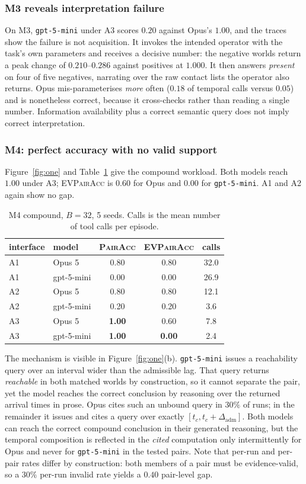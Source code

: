 \documentclass[sigconf,anonymous,review]{acmart}
\newcommand{\pairacc}{\textsc{PairAcc}}
\newcommand{\evpair}{\textsc{EVPairAcc}}
\begin{document}
\subsubsection{M3 reveals interpretation failure}
\label{sec:m3}
On M3, \texttt{gpt-5-mini} under A3 scores $0.20$ against Opus's $1.00$, and the traces show the
failure is not acquisition. It invokes the intended operator with the task's own parameters and
receives a decisive number: the negative worlds return a peak change of $0.210$--$0.286$ against
positives at $1.000$. It then answers \emph{present} on four of five negatives, narrating over the
raw contact lists the operator also returns. Opus mis-parameterises \emph{more} often ($0.18$ of
temporal calls versus $0.05$) and is nonetheless correct, because it cross-checks rather than
reading a single number. Information availability plus a correct semantic query does not imply
correct interpretation.

\subsubsection{M4: perfect accuracy with no valid support}
Figure~\ref{fig:one} and Table~\ref{tab:m4} give the compound workload. Both models reach $1.00$
under A3; \evpair{} is $0.60$ for Opus and $0.00$ for \texttt{gpt-5-mini}. A1 and A2 again show no
gap.

\begin{table}[t]
\caption{M4 compound, $B{=}32$, 5 seeds. Calls is the mean number of tool calls per episode.}
\label{tab:m4}
\small
\begin{tabular}{@{}llccc@{}}
\toprule
interface & model & \pairacc & \evpair & calls \\
\midrule
A1 & Opus 5     & 0.80 & 0.80 & 32.0 \\
A1 & gpt-5-mini & 0.00 & 0.00 & 26.9 \\
A2 & Opus 5     & 0.80 & 0.80 & 12.1 \\
A2 & gpt-5-mini & 0.20 & 0.20 & 3.6 \\
A3 & Opus 5     & \textbf{1.00} & 0.60 & 7.8 \\
A3 & gpt-5-mini & \textbf{1.00} & \textbf{0.00} & 2.4 \\
\bottomrule
\end{tabular}
\end{table}

The mechanism is visible in Figure~\ref{fig:one}(b). \texttt{gpt-5-mini} issues a reachability
query over an interval wider than the admissible lag. That query returns \emph{reachable} in both
matched worlds by construction, so it cannot separate the pair, yet the model reaches the
correct conclusion by reasoning over the returned arrival times in prose. Opus cites such an unbound query in $30\%$ of runs; in the remainder it issues and cites a query
over exactly $[t_c,t_c+\Delta_{\text{adm}}]$. Both models can reach the correct compound conclusion
in their generated reasoning, but the temporal composition is reflected in the \emph{cited}
computation only intermittently for Opus and never for \texttt{gpt-5-mini} in the tested pairs.
Note that per-run and per-pair rates differ by construction: both members of a pair must be
evidence-valid, so a $30\%$ per-run invalid rate yields a $0.40$ pair-level gap.
\end{document}
